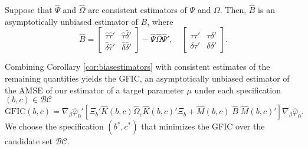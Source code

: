 \begin{cor}
\label{cor:biasestimators}
Suppose that $\widehat{\Psi}$ and $\widehat{\Omega}$ are consistent estimators of $\Psi$ and $\Omega$. Then, $\widehat{B}$ is an asymptotically unbiased estimator of $B$, where
\[
  \widehat{B} = \left[\begin{array}{cc}  \widehat{\tau} \widehat{\tau}'& \widehat{\tau} \widehat{\delta}'\\ \widehat{\delta} \widehat{\tau}'& \widehat{\delta} \widehat{\delta}'\end{array}\right] - \widehat{\Psi} \widehat{\Omega} \widehat{\Psi}', \quad
\left[\begin{array}{cc}  \tau \tau'& \tau \delta'\\ \delta \tau'& \delta \delta'\end{array}\right].
\]
\end{cor}
Combining Corollary \ref{cor:biasestimators} with consistent estimates of the remaining quantities yields the GFIC, an asymptotically unbiased estimator of the AMSE of our estimator of a target parameter $\mu$ under each specification $(b,c)\in \mathcal{BC}$
\begin{equation}
\mbox{GFIC}(b,c) =\nabla_\beta \widehat{\varphi}_0' \left[\Xi_b' \widehat{K}(b,c)\widehat{\Omega}_c \widehat{K}(b,c)'\Xi_b +  \widehat{M}(b,c) \;\widehat{B} \; \widehat{M}(b,c)'\right]\nabla_\beta \widehat{\varphi}_0.
\end{equation}
We choose the specification $(b^*,c^*)$ that minimizes the GFIC over the candidate set $\mathcal{BC}$. 


